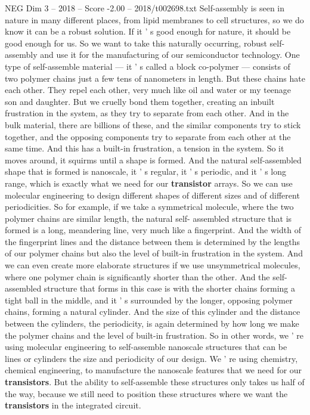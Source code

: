 \begin{textsample}{NEG Dim 3 – 2018 – Score -2.00 – 2018/t002698.txt}
Self-assembly is seen in nature in many different places, from lipid membranes to cell structures, so we do know it can be a robust solution.
If it ' s good enough for nature, it should be good enough for us.
So we want to take this naturally occurring, robust self- assembly and use it for the manufacturing of our semiconductor technology.
One type of self-assemble material — it ' s called a block co-polymer — consists of two polymer chains just a few tens of nanometers in length.
But these chains hate each other.
They repel each other, very much like oil and water or my teenage son and daughter.
But we cruelly bond them together, creating an inbuilt frustration in the system, as they try to separate from each other.
And in the bulk material, there are billions of these, and the similar components try to stick together, and the opposing components try to separate from each other at the same time.
And this has a built-in frustration, a tension in the system.
So it moves around, it squirms until a shape is formed.
And the natural self-assembled shape that is formed is nanoscale, it ' s regular, it ' s periodic, and it ' s long range, which is exactly what we need for our \textbf{transistor} arrays.
So we can use molecular engineering to design different shapes of different sizes and of different periodicities.
So for example, if we take a symmetrical molecule, where the two polymer chains are similar length, the natural self- assembled structure that is formed is a long, meandering line, very much like a fingerprint.
And the width of the fingerprint lines and the distance between them is determined by the lengths of our polymer chains but also the level of built-in frustration in the system.
And we can even create more elaborate structures if we use unsymmetrical molecules, where one polymer chain is significantly shorter than the other.
And the self-assembled structure that forms in this case is with the shorter chains forming a tight ball in the middle, and it ' s surrounded by the longer, opposing polymer chains, forming a natural cylinder.
And the size of this cylinder and the distance between the cylinders, the periodicity, is again determined by how long we make the polymer chains and the level of built-in frustration.
So in other words, we ' re using molecular engineering to self-assemble nanoscale structures that can be lines or cylinders the size and periodicity of our design.
We ' re using chemistry, chemical engineering, to manufacture the nanoscale features that we need for our \textbf{transistors}.
But the ability to self-assemble these structures only takes us half of the way, because we still need to position these structures where we want the \textbf{transistors} in the integrated circuit.

\end{textsample}
